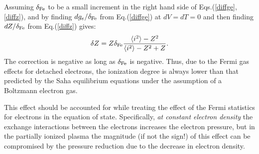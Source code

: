 Assuming $\delta_{\rm Fe}$ to be a small increment in the right hand side of Eqs.(\ref{diffge},\ref{diffz}), and by
finding $dg_e/\delta_{\rm Fe}$ from Eq.(\ref{diffge}) at $dV=dT=0$ and then finding $dZ/\delta_{\rm Fe}$ from Eq.(\ref{diffz}) gives:
\begin{equation}
\delta Z=Z\delta_{\rm Fe}\frac{\langle i^2\rangle-Z^2}{\langle i^2\rangle-Z^2+Z}. 
\end{equation}
The correction is negative as long as $\delta_{\rm Fe}$ is negative. Thus, due to the Fermi gas effects for detached electrons, the ionization degree is
always lower than that predicted by the Saha equilibrium equations under the assumption of a Boltzmann electron gas.

This effect should be accounted for while
treating the effect of the Fermi statistics for electrons in the equation of state. Specifically, {\it at constant electron density} the exchange interactions 
between the electrons increases the electron pressure, but in the partially ionized plasma the magnitude (if not the sign!) of this effect can be  
compromised by the pressure reduction due to the decrease in electron density. 


